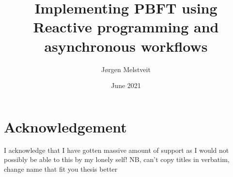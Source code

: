 \documentclass[12pt, a4paper]{report}
\numberwithin{figure}{section}
\numberwithin{table}{section}
\begin{document}
	\hspace*{-7mm}
	\vspace*{-15mm}
	\thispagestyle{empty}
	\newpage

	
	
	\title{Implementing PBFT using Reactive programming and asynchronous workflows}
	\author{Jørgen Melstveit}
	\date{June 2021}
	\maketitle
	\tableofcontents
	\newpage

	\section*{Acknowledgement}
	I acknowledge that I have gotten massive amount of support as I would not possibly be able to this by my lonely self! 	
	NB, can't copy titles in verbatim, change name that fit you thesis better
	\newpage	
	\iffalse	
\end{document}
